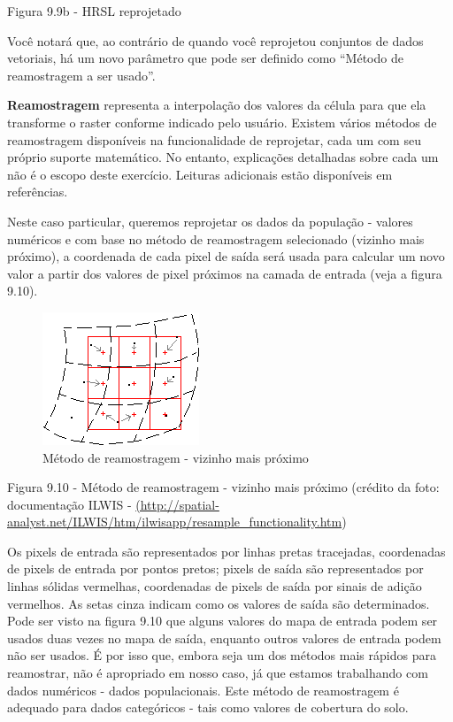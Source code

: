 \documentclass[
]{krantz}
\begin{document}
Figura 9.9b - HRSL reprojetado

Você notará que, ao contrário de quando você reprojetou conjuntos de dados vetoriais, há um novo parâmetro que pode ser definido como ``Método de reamostragem a ser usado''.

\textbf{Reamostragem} representa a interpolação dos valores da célula para que ela transforme o raster conforme indicado pelo usuário. Existem vários métodos de reamostragem disponíveis na funcionalidade de reprojetar, cada um com seu próprio suporte matemático. No entanto, explicações detalhadas sobre cada um não é o escopo deste exercício. Leituras adicionais estão disponíveis em referências.

Neste caso particular, queremos reprojetar os dados da população - valores numéricos e com base no método de reamostragem selecionado (vizinho mais próximo), a coordenada de cada pixel de saída será usada para calcular um novo valor a partir dos valores de pixel próximos na camada de entrada (veja a figura 9.10).

\begin{figure}
\centering
\includegraphics{media/modulo9/fig910.png}
\caption{Método de reamostragem - vizinho mais próximo}
\end{figure}

Figura 9.10 - Método de reamostragem - vizinho mais próximo (crédito da foto: documentação ILWIS - \href{http://spatial-analyst.net/ILWIS/htm/ilwisapp/resample_functionality.htm}{(http://spatial-analyst.net/ILWIS/htm/ilwisapp/resample\_functionality.htm})

Os pixels de entrada são representados por linhas pretas tracejadas, coordenadas de pixels de entrada por pontos pretos; pixels de saída são representados por linhas sólidas vermelhas, coordenadas de pixels de saída por sinais de adição vermelhos. As setas cinza indicam como os valores de saída são determinados. Pode ser visto na figura 9.10 que alguns valores do mapa de entrada podem ser usados \hspace{0pt}\hspace{0pt}duas vezes no mapa de saída, enquanto outros valores de entrada podem não ser usados. É por isso que, embora seja um dos métodos mais rápidos para reamostrar, não é apropriado em nosso caso, já que estamos trabalhando com dados numéricos - dados populacionais. Este método de reamostragem é adequado para dados categóricos - tais como valores de cobertura do solo.
\end{document}
